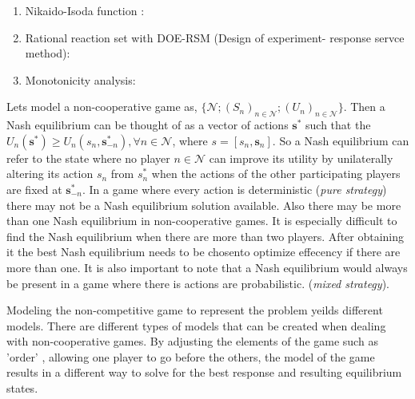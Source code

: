 \documentclass[phd, 12pt, print]{fauthesis}
\begin{document}
\begin{enumerate}
  \item Nikaido-Isoda function : 
  \item Rational reaction set with DOE-RSM (Design of experiment- response servce method):
  \item Monotonicity analysis:
\end{enumerate}

Lets model a  non-cooperative game as, ${\{\mathcal{N};(S_{n})_{n\in \mathcal{N}};(U_{n})_{n\in \mathcal{N}}\}}$.
Then a Nash equilibrium can be thought of as a vector of actions $\textbf{s}^{*}$ such that the 
$U_{n}(\textbf{s}^{*}) \geq U_{n}(s_{n},\textbf{s}^{*}_{-n}), \forall n \in \mathcal{N}$, 
where $s=[s_{n},\textbf{s}_{n}]$. So a Nash equilibrium can refer to the state where no player $n \in \mathcal{N}$
can improve its utility by unilaterally altering its action $s_{n}$ from $s^{*}_{n}$ 
when the actions of the other participating players are fixed
at $\textbf{s}^{*}_{-n}$. In a game where every action is deterministic (\textit{pure strategy}) 
there may not be a Nash equilibrium solution available. Also there may be more than
one Nash equilibrium in non-cooperative games. It is especially difficult 
to find the Nash equilibrium when there are more than two players. After obtaining it the 
best Nash equilibrium needs to be chosento optimize effecency if there are more than one. 
It is also important to note that a Nash equilibrium would always be present in a game where 
there is actions are probabilistic. (\textit{mixed strategy}).\cite{Tushar2}

Modeling the non-competitive game to represent the problem yeilds different models. 
There are different types of models that can be created when dealing with
non-cooperative games. By adjusting the elements of the game such as
'order' , allowing one player to go before the others, the model of the game
results in a different way to solve for the best response and resulting
equilibrium states. 
\end{document}
